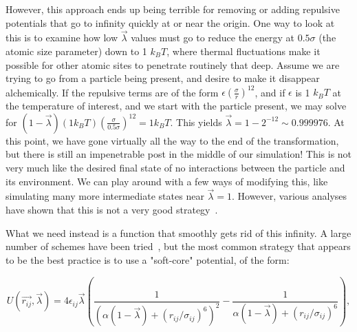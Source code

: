 \documentclass[9pt,bestpractices]{livecoms}
\begin{document}
However, this approach ends up being terrible for removing or adding repulsive potentials that go to infinity quickly at or near the origin. One way to look at this is to examine how low $\vec{\lambda}$ values must go to reduce the energy at $0.5\sigma$ (the atomic size parameter) down to 1 $k_BT$, where thermal fluctuations make it possible for other atomic sites to penetrate routinely that deep. Assume we are trying to go from a particle being present, and desire to make it disappear alchemically. If the repulsive terms are of the form $\epsilon(\frac{\sigma}{r})^{12}$, and if $\epsilon$ is 1 $k_BT$ at the temperature of interest, and we start with the particle present, we may solve for $(1-\vec{\lambda})(1 k_B T)\left(\frac{\sigma}{0.5\sigma}\right)^{12} = 1 k_B T$. This yields $\vec{\lambda} = 1-2^{-12} \sim 0.999976$. At this point,  we have gone virtually all the way to the end of the transformation, but there is still an impenetrable post in the middle of our simulation! This is not very much like the desired final state of no interactions between the particle and its environment. We can play around with a few ways of modifying this, like simulating many more intermediate states near $\vec{\lambda}=1$. However, various analyses have shown that this is not a very good strategy~\cite{pham2011identifying, beutler1994avoiding, zacharias1994separationshifted, blondel2004ensemble, gapsys2012new}.

What we need instead is a function that smoothly gets rid of this infinity. A large number of schemes have been tried~\cite{beutler1994avoiding, zacharias1994separationshifted, blondel2004ensemble, pham2011identifying, pham2012optimal, naden2014linear, donnini2005incorporating}, but the most common strategy that appears to be the best practice is to use a "soft-core" potential, of the form:

\begin{equation}
    U(\vec{r_{ij}},\vec{\lambda}) = 4\epsilon_{ij} \vec{\lambda} \left(\frac{1}{(\alpha(1-\vec{\lambda}) + (r_{ij}/\sigma_{ij})^6)^2} -  \frac{1}{\alpha(1-\vec{\lambda}) + (r_{ij}/\sigma_{ij})^6}\right)
    \label{eq:softcore},
\end{equation}
\end{document}
